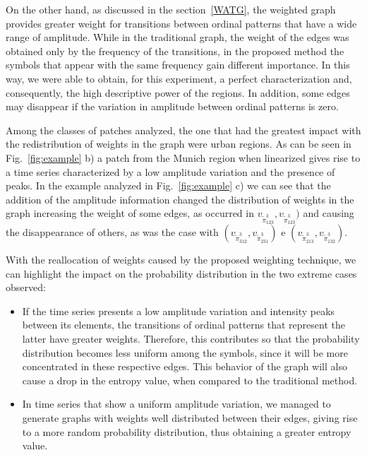 \documentclass[journal]{IEEEtran}
\begin{document}
	On the other hand, as discussed in the section~\ref{WATG}, the weighted graph provides greater weight for transitions between ordinal patterns that have a wide range of amplitude.
	While in the traditional graph, the weight of the edges was obtained only by the frequency of the transitions, in the proposed method the symbols that appear with the same frequency gain different importance.
	In this way, we were able to obtain, for this experiment, a perfect characterization and, consequently, the high descriptive power of the regions.
	In addition, some edges may disappear if the variation in amplitude between ordinal patterns is zero.
	
	Among the classes of patches analyzed, the one that had the greatest impact with the redistribution of weights in the graph were urban regions.
	As can be seen in Fig.~\ref{fig:example} b) a patch from the Munich region when linearized gives rise to a time series characterized by a low amplitude variation and the presence of peaks.
	In the example analyzed in Fig.~\ref{fig:example} c) we can see that the addition of the amplitude information changed the distribution of weights in the graph increasing the weight of some edges, as occurred in $v_{\widetilde \pi^3_{123}}, v_{\widetilde \pi^3_{123}})$ and causing the disappearance of others, as was the case with $(v_{\widetilde \pi^3_{312}}, v_{\widetilde \pi^3_{231}})$ e $(v_{\widetilde \pi^3_{213}}, v_{\widetilde \pi^3_{132}})$.
	
	With the reallocation of weights caused by the proposed weighting technique, we can highlight the impact on the probability distribution in the two extreme cases observed:
	
	\begin{itemize}
		\item If the time series presents a low amplitude variation and intensity peaks between its elements, the transitions of ordinal patterns that represent the latter have greater weights.
		Therefore, this contributes so that the probability distribution becomes less uniform among the symbols, since it will be more concentrated in these respective edges.
		This behavior of the graph will also cause a drop in the entropy value, when compared to the traditional method.
		
		\item In time series that show a uniform amplitude variation, we managed to generate graphs with weights well distributed between their edges, giving rise to a more random probability distribution, thus obtaining a greater entropy value.
	\end{itemize}
	
\end{document}
